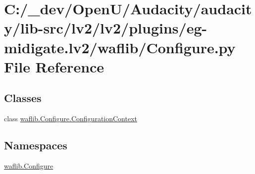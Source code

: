 \hypertarget{lv2_2plugins_2eg-midigate_8lv2_2waflib_2_configure_8py}{}\section{C\+:/\+\_\+dev/\+Open\+U/\+Audacity/audacity/lib-\/src/lv2/lv2/plugins/eg-\/midigate.lv2/waflib/\+Configure.py File Reference}
\label{lv2_2plugins_2eg-midigate_8lv2_2waflib_2_configure_8py}
\subsection*{Classes}
\begin{DoxyCompactItemize}
\item 
class \hyperlink{classwaflib_1_1_configure_1_1_configuration_context}{waflib.\+Configure.\+Configuration\+Context}
\end{DoxyCompactItemize}
\subsection*{Namespaces}
\begin{DoxyCompactItemize}
\item 
 \hyperlink{namespacewaflib_1_1_configure}{waflib.\+Configure}
\end{DoxyCompactItemize}
